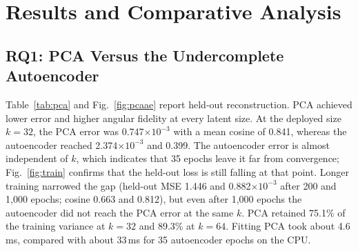 \documentclass[conference]{IEEEtran}
\begin{document}
\section{Results and Comparative Analysis}
\subsection{RQ1: PCA Versus the Undercomplete Autoencoder}
Table~\ref{tab:pca} and Fig.~\ref{fig:pcaae} report held-out reconstruction. PCA achieved lower error and higher angular fidelity at every latent size. At the deployed size $k=32$, the PCA error was 0.747$\times10^{-3}$ with a mean cosine of 0.841, whereas the autoencoder reached 2.374$\times10^{-3}$ and 0.399. The autoencoder error is almost independent of $k$, which indicates that 35 epochs leave it far from convergence; Fig.~\ref{fig:train} confirms that the held-out loss is still falling at that point. Longer training narrowed the gap (held-out MSE 1.446 and 0.882$\times10^{-3}$ after 200 and 1{,}000 epochs; cosine 0.663 and 0.812), but even after 1{,}000 epochs the autoencoder did not reach the PCA error at the same $k$. PCA retained 75.1\% of the training variance at $k=32$ and 89.3\% at $k=64$. Fitting PCA took about 4.6\,ms, compared with about 33\,ms for 35 autoencoder epochs on the CPU.
\end{document}
